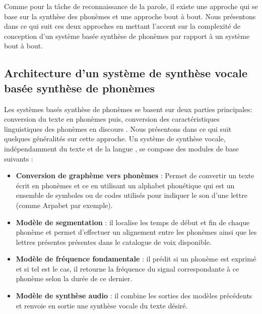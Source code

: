 Comme pour la tâche de reconnaissance de la parole, il existe une approche qui se base sur la synthèse des phonèmes et une approche bout à bout. Nous présentons dans ce qui suit ces deux approches en mettant l'accent sur la complexité de conception d'un système basée synthèse de phonèmes par rapport à un système bout à bout.

\subsection{Architecture d'un système de synthèse vocale basée synthèse de phonèmes}
Les systèmes basés synthèse de phonèmes se basent sur deux parties principales: conversion du texte en phonèmes puis, conversion des caractéristiques linguistiques des phonèmes en discours \cite{textspeechpres}. Nous présentons dans ce qui suit quelques généralités sur cette approche.
Un système de synthèse vocale, indépendamment du texte et de la langue , se compose des modules de base suivants \cite{textspeechmodules} :
\begin{itemize}
    \item \textbf{Conversion de graphème vers phonèmes} : Permet de convertir un texte écrit en phonèmes et ce en utilisant un alphabet phonétique qui est un ensemble de symboles ou de codes utilisés pour indiquer le son d'une lettre (comme Arpabet \cite{arpabet} par exemple).
    \item \textbf{Modèle de segmentation} : il localise les temps de début et fin de chaque phonème et permet d'effectuer un alignement entre les phonèmes ainsi que les lettres présentes présentes dans le catalogue de voix disponible.
    \item \textbf{Modèle de fréquence fondamentale} :  il prédit si un phonème est exprimé et si tel est le cas, il retourne la fréquence du signal correspondante à ce phonème selon la durée de ce dernier.
    \item \textbf{Modèle de synthèse audio} : il combine les sorties des modèles précédents et renvoie en sortie une synthèse vocale du texte désiré. 
\end{itemize}
 
